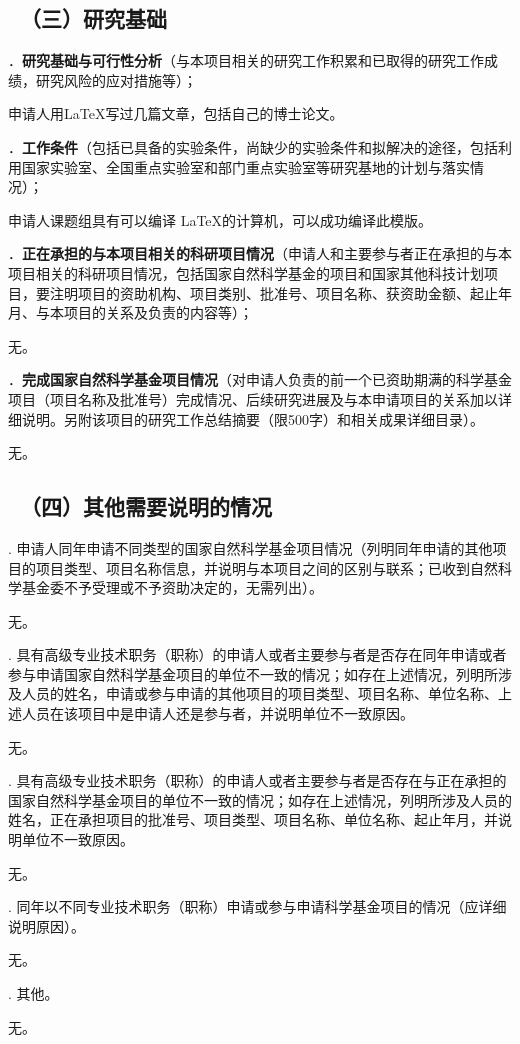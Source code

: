 \documentclass[12pt,UTF8,AutoFakeBold=2,a4paper]{ctexart} %
\newcommand{\sihao}{\fontsize{14pt}{\baselineskip}\selectfont}
\begin{document}
	\vskip -5mm %
	
	{\color{MsBlue} \subsection{\sihao \kaishu \quad \ （三）研究基础}}
	\vskip -2mm 
	{\sihao \color{MsBlue} ．{\bfseries 研究基础与可行性分析}（与本项目相关的研究工作积累和已取得的研究工作成绩，研究风险的应对措施等）；}
	
	申请人用\LaTeX 写过几篇文章，包括自己的博士论文。
	
	{\sihao \color{MsBlue} ．{\bfseries 工作条件}（包括已具备的实验条件，尚缺少的实验条件和拟解决的途径，包括利用国家实验室、全国重点实验室和部门重点实验室等研究基地的计划与落实情况）；}
	
	申请人课题组具有可以编译 \LaTeX 的计算机，可以成功编译此模版。
	
	{\sihao \color{MsBlue} ．{\bfseries 正在承担的与本项目相关的科研项目情况}（申请人和主要参与者正在承担的与本项目相关的科研项目情况，包括国家自然科学基金的项目和国家其他科技计划项目，要注明项目的资助机构、项目类别、批准号、项目名称、获资助金额、起止年月、与本项目的关系及负责的内容等）；}
	
	无。
	
	{\sihao \color{MsBlue} ．{\bfseries 完成国家自然科学基金项目情况}（对申请人负责的前一个已资助期满的科学基金项目（项目名称及批准号）完成情况、后续研究进展及与本申请项目的关系加以详细说明。另附该项目的研究工作总结摘要（限500字）和相关成果详细目录）。}
	
	无。
	
	{\color{MsBlue} \subsection{\sihao \kaishu \quad \ （四）其他需要说明的情况 }}
	
	{\sihao \color{MsBlue} . 申请人同年申请不同类型的国家自然科学基金项目情况（列明同年申请的其他项目的项目类型、项目名称信息，并说明与本项目之间的区别与联系；已收到自然科学基金委不予受理或不予资助决定的，无需列出）。}
	
	无。
	
	{\sihao \color{MsBlue} . 具有高级专业技术职务（职称）的申请人或者主要参与者是否存在同年申请或者参与申请国家自然科学基金项目的单位不一致的情况；如存在上述情况，列明所涉及人员的姓名，申请或参与申请的其他项目的项目类型、项目名称、单位名称、上述人员在该项目中是申请人还是参与者，并说明单位不一致原因。}
	
	无。
	
	{\sihao \color{MsBlue} . 具有高级专业技术职务（职称）的申请人或者主要参与者是否存在与正在承担的国家自然科学基金项目的单位不一致的情况；如存在上述情况，列明所涉及人员的姓名，正在承担项目的批准号、项目类型、项目名称、单位名称、起止年月，并说明单位不一致原因。}
	
	无。
	
	{\sihao \color{MsBlue} . 同年以不同专业技术职务（职称）申请或参与申请科学基金项目的情况（应详细说明原因）。}
	
	无。
	
	{\sihao \color{MsBlue} . 其他。}
	
	无。
	
\end{document}
